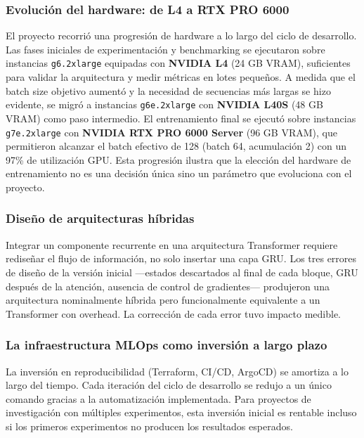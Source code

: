 \subsubsection{Evolución del hardware: de L4 a RTX PRO 6000}

El proyecto recorrió una progresión de hardware a lo largo del ciclo de desarrollo. Las fases iniciales de experimentación y benchmarking se ejecutaron sobre instancias \texttt{g6.2xlarge} equipadas con \textbf{NVIDIA L4} (24 GB VRAM), suficientes para validar la arquitectura y medir métricas en lotes pequeños. A medida que el batch size objetivo aumentó y la necesidad de secuencias más largas se hizo evidente, se migró a instancias \texttt{g6e.2xlarge} con \textbf{NVIDIA L40S} (48 GB VRAM) como paso intermedio. El entrenamiento final se ejecutó sobre instancias \texttt{g7e.2xlarge} con \textbf{NVIDIA RTX PRO 6000 Server} (96 GB VRAM), que permitieron alcanzar el batch efectivo de 128 (batch 64, acumulación 2) con un 97\% de utilización GPU. Esta progresión ilustra que la elección del hardware de entrenamiento no es una decisión única sino un parámetro que evoluciona con el proyecto.

\subsubsection{Diseño de arquitecturas híbridas}

Integrar un componente recurrente en una arquitectura Transformer requiere rediseñar el flujo de información, no solo insertar una capa GRU. Los tres errores de diseño de la versión inicial ---estados descartados al final de cada bloque, GRU después de la atención, ausencia de control de gradientes--- produjeron una arquitectura nominalmente híbrida pero funcionalmente equivalente a un Transformer con overhead. La corrección de cada error tuvo impacto medible.

\subsubsection{La infraestructura MLOps como inversión a largo plazo}

La inversión en reproducibilidad (Terraform, CI/CD, ArgoCD) se amortiza a lo largo del tiempo. Cada iteración del ciclo de desarrollo se redujo a un único comando gracias a la automatización implementada. Para proyectos de investigación con múltiples experimentos, esta inversión inicial es rentable incluso si los primeros experimentos no producen los resultados esperados.

